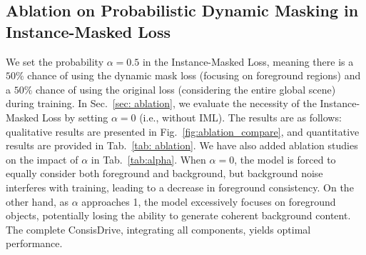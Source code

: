 \begin{table}[t]
    \centering
    \footnotesize
    \caption{Comparison of MOT task performance on real or generated nuScenes (T+I)2V validation data. Evaluated with pre-trained StreamPETR, our model outperforms DriveDreamer2, showing its ability to faithfully propagate instance attributes over frames.
    }
    \label{tab: mot_val}
\end{table}








\subsection{Ablation on Probabilistic Dynamic Masking in Instance-Masked Loss}
We set the probability $\alpha=0.5$ in the Instance-Masked Loss, meaning there is a $50\%$ chance of using the dynamic mask loss (focusing on foreground regions) and a $50\%$ chance of using the original loss (considering the entire global scene) during training.
In Sec.~\ref{sec: ablation}, we evaluate the necessity of the Instance-Masked Loss by setting $\alpha = 0$ (i.e., without IML). The results are as follows: qualitative results are presented in Fig.~\ref{fig:ablation_compare}, and quantitative results are provided in Tab.~\ref{tab: ablation}.
We have also added ablation studies on the impact of $\alpha$ in Tab.~\ref{tab:alpha}.
When $\alpha = 0$, the model is forced to equally consider both foreground and background, but background noise interferes with training, leading to a decrease in foreground consistency. 
On the other hand, as $\alpha$ approaches 1, the model excessively focuses on foreground objects, potentially losing the ability to generate coherent background content.
The complete ConsisDrive, integrating all components, yields optimal performance.





